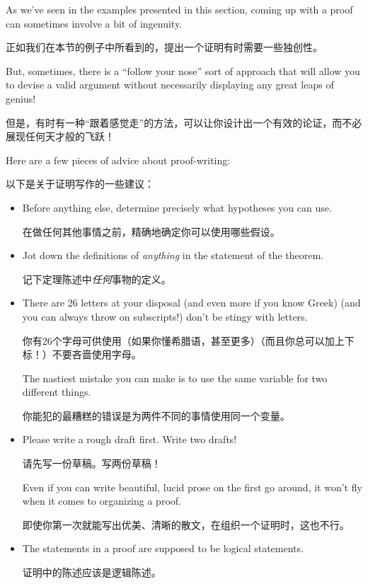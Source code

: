 As we've seen in the examples presented in this section, coming up
with a proof can sometimes involve a bit of ingenuity.

正如我们在本节的例子中所看到的，提出一个证明有时需要一些独创性。

But, sometimes,
there is a ``follow your nose'' sort of approach that will
allow you to devise a valid argument without necessarily displaying
any great leaps of genius!

但是，有时有一种“跟着感觉走”的方法，可以让你设计出一个有效的论证，而不必展现任何天才般的飞跃！

Here are a few pieces
of advice about proof-writing:

以下是关于证明写作的一些建议：

\begin{itemize}
      \item Before anything else, determine precisely what hypotheses you
            can use.

            在做任何其他事情之前，精确地确定你可以使用哪些假设。
      \item Jot down the definitions of {\em anything} in the statement of
            the theorem.

            记下定理陈述中{\em 任何}事物的定义。
      \item There are 26 letters at your disposal (and even more if you know
            Greek) (and you can always throw on subscripts!) don't be stingy with
            letters.

            你有26个字母可供使用（如果你懂希腊语，甚至更多）（而且你总可以加上下标！）不要吝啬使用字母。

            The nastiest mistake you can make is to use the same variable
            for two different things.

            你能犯的最糟糕的错误是为两件不同的事情使用同一个变量。
      \item Please write a rough draft first.  Write two drafts!

            请先写一份草稿。写两份草稿！

            Even if you
            can write beautiful, lucid prose on the first go around, it won't fly
            when it comes to organizing a proof.

            即使你第一次就能写出优美、清晰的散文，在组织一个证明时，这也不行。
      \item The statements in a proof are supposed to be logical statements.

            证明中的陈述应该是逻辑陈述。


\end{itemize}
